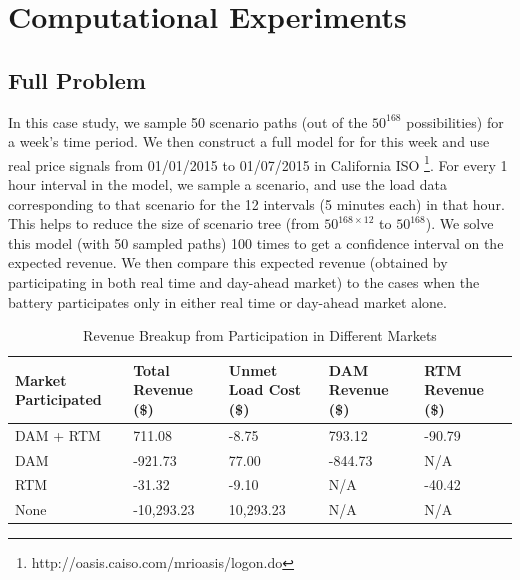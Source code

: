 \documentclass[11pt,twoside]{article}
\begin{document}
\section{Computational Experiments}\label{sec:exp}

\subsection{Full Problem}
In this case study, we sample 50 scenario paths (out of the $50^{168}$ possibilities) for a week's time period. We then construct a full model for for this week and use real price signals from 01/01/2015 to 01/07/2015 in California ISO \footnote{http://oasis.caiso.com/mrioasis/logon.do}. For every 1 hour interval in the model, we sample a scenario, and use the load data corresponding to that scenario for the 12 intervals (5 minutes each) in that hour. This helps to reduce the size of scenario tree (from $50^{168 \times 12}$ to $50^{168}$). We solve this model (with 50 sampled paths) 100 times to get a confidence interval on the expected revenue. We then compare this expected revenue (obtained by participating in both real time and day-ahead market) to the cases when the battery participates only in either real time or day-ahead market alone.
\begin{table}[!ht]\centering
\caption{Revenue Breakup from Participation in Different Markets}
\begin{tabular}{|C{3cm}|C{2.5cm}|C{3.5cm}|C{3cm}|C{2.5cm}|} 
\hline 
Market Participated  & Total Revenue (\$) & Unmet Load Cost (\$) & DAM Revenue  (\$) & RTM Revenue (\$) \\
\hline 
DAM + RTM & 711.08 & -8.75 & 793.12 & -90.79 \\ 
\hline 
DAM & -921.73 & 77.00 & -844.73 & N/A \\ 
\hline 
RTM & -31.32 & -9.10 & N/A & -40.42 \\ 
\hline 
None & -10,293.23 & 10,293.23 & N/A & N/A \\ 
\hline 
\end{tabular} \label{tab:rev_comp} 
\end{table}
\end{document}
